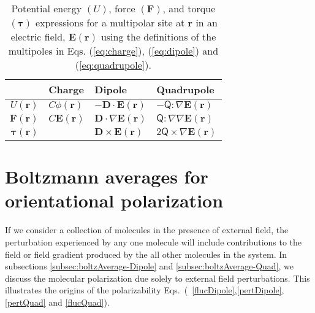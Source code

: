 \begin{table}
\begin{center}
\caption{Potential energy $(U)$, force $(\mathbf{F})$, and torque
  $(\mathbf{\tau})$ expressions for a multipolar site at $\mathbf{r}$ in an
  electric field, $\mathbf{E}(\mathbf{r})$ using the definitions of the multipoles in Eqs. (\ref{eq:charge}), (\ref{eq:dipole}) and (\ref{eq:quadrupole}).  
  \label{tab:UFT}}
\begin{tabular}{r|C{3cm}C{3cm}C{3cm}}
  & Charge & Dipole & Quadrupole \\ \hline
$U(\mathbf{r})$ &  $C \phi(\mathbf{r})$ & $-\mathbf{D} \cdot \mathbf{E}(\mathbf{r})$ & $- \mathsf{Q}:\nabla \mathbf{E}(\mathbf{r})$ \\
$\mathbf{F}(\mathbf{r})$ & $C \mathbf{E}(\mathbf{r})$ & $\mathbf{D} \cdot \nabla \mathbf{E}(\mathbf{r})$ &  $\mathsf{Q} : \nabla\nabla\mathbf{E}(\mathbf{r})$ \\
$\mathbf{\tau}(\mathbf{r})$ & & $\mathbf{D} \times \mathbf{E}(\mathbf{r})$ & $2 \mathsf{Q} \times \nabla \mathbf{E}(\mathbf{r})$
\end{tabular}
\end{center}
\end{table}

\section{Boltzmann averages for orientational polarization}
If we consider a collection of molecules in the presence of external
field, the perturbation experienced by any one molecule will include
contributions to the field or field gradient produced by the all other
molecules in the system. In subsections
\ref{subsec:boltzAverage-Dipole} and \ref{subsec:boltzAverage-Quad},
we discuss the molecular polarization due solely to external field
perturbations.  This illustrates the origins of the polarizability
Eqs.~(~\ref{flucDipole},\ref{pertDipole}, \ref{pertQuad} and \ref{flucQuad}).

